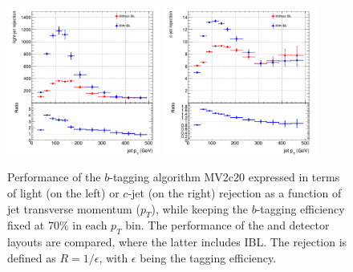 \begin{figure}
\centering
\includegraphics[width=0.45\textwidth]{Images/IBL_paper/chapter02_Physics/btagging/jet_pt_MV2c20__l_flat}
\includegraphics[width=0.45\textwidth]{Images/IBL_paper/chapter02_Physics/btagging/jet_pt_MV2c20__c_flat}
\caption{\label{fig:btagging_vsPT} Performance of the $b$-tagging algorithm MV2c20 expressed in terms of light (on the left) or $c$-jet (on the right) rejection as a function of jet transverse momentum ($p_{T}$), while keeping the $b$-tagging efficiency fixed at 70\% in each $p_{T}$ bin. The performance of the \runone and \runtwo detector layouts are compared, where the latter includes IBL. The rejection is defined as $R=1/\epsilon$, with $\epsilon$ being the tagging efficiency.}
\end{figure}


